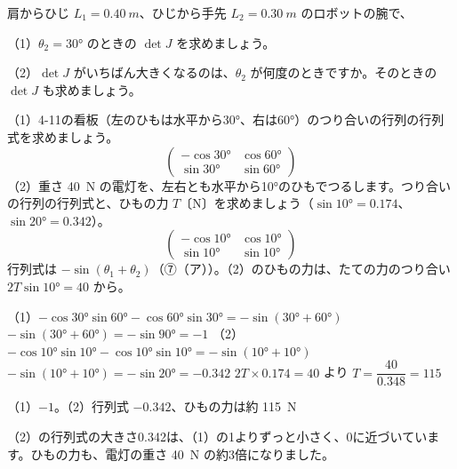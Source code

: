 \begin{jibun}
肩からひじ $L_1=\qty{0.40}{m}$、ひじから手先 $L_2=\qty{0.30}{m}$ のロボットの腕で、\par
（1）$\theta_2=30°$ のときの $\det J$ を求めましょう。\par
（2）$\det J$ がいちばん大きくなるのは、$\theta_2$ が何度のときですか。そのときの $\det J$ も求めましょう。
\end{jibun}

\begin{reidai}[ひもの角と行列式]
（1）4-11の看板（左のひもは水平から30°、右は60°）のつり合いの行列の行列式を求めましょう。
\[ \begin{pmatrix}-\cos30°&\cos60°\\ \sin30°&\sin60°\end{pmatrix} \]
（2）重さ \qty{40}{N} の電灯を、左右とも水平から10°のひもでつるします。つり合いの行列の行列式と、ひもの力 $T$〔N〕を求めましょう（$\sin10°=0.174$、$\sin20°=0.342$）。
\[ \begin{pmatrix}-\cos10°&\cos10°\\ \sin10°&\sin10°\end{pmatrix} \]
\kangaekata 行列式は $-\sin(\theta_1+\theta_2)$（⑦（ア））。（2）のひもの力は、たての力のつり合い $2T\sin10°=40$ から。\par
\shiki（1）$-\cos30°\sin60°-\cos60°\sin30°=-\sin(30°+60°)$\kviieq
$-\sin(30°+60°)=-\sin90°=-1$\kviieq
（2）$-\cos10°\sin10°-\cos10°\sin10°=-\sin(10°+10°)$\kviieq
$-\sin(10°+10°)=-\sin20°=-0.342$\kviieq
$2T\times0.174=40$ より $T=\dfrac{40}{0.348}=115$\par
\kotae（1）\nobreak $-1$。（2）\nobreak 行列式 $-0.342$、ひもの力は約 \qty{115}{N}
\end{reidai}
\noindent （2）の行列式の大きさ0.342は、（1）の1よりずっと小さく、0に近づいています。ひもの力も、電灯の重さ \qty{40}{N} の約3倍になりました。

